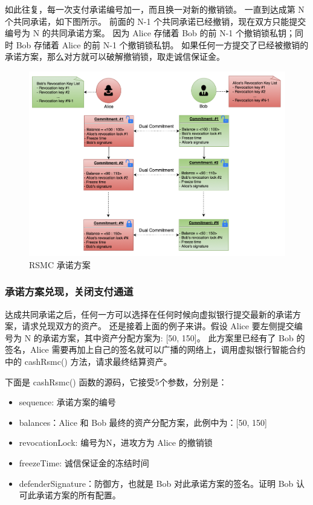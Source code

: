 \begin{appendices}
如此往复，每一次支付承诺编号加一，而且换一对新的撤销锁。
一直到达成第 N 个共同承诺，如下图所示。
前面的 N-1 个共同承诺已经撤销，现在双方只能提交编号为 N 的共同承诺方案。
因为 Alice 存储着 Bob 的前 N-1 个撤销锁私钥；同时 Bob 存储着 Alice 的前 N-1 个撤销锁私钥。
如果任何一方提交了已经被撤销的承诺方案，那么对方就可以破解撤销锁，取走诚信保证金。

\begin{figure}[h!]
    \centering
    \includegraphics[width=12cm, keepaspectratio]{../images/dual_rsmc_3.png}
    \caption{RSMC 承诺方案}
    \label{fig:A_rsmc_4}
\end{figure}

\subsubsection{承诺方案兑现，关闭支付通道}
达成共同承诺之后，任何一方可以选择在任何时候向虚拟银行提交最新的承诺方案，请求兑现双方的资产。
还是接着上面的例子来讲。假设 Alice 要左侧提交编号为 N 的承诺方案，其中资产分配方案为: [50, 150]。
此方案里已经有了 Bob 的签名，Alice 需要再加上自己的签名就可以广播的网络上，调用虚拟银行智能合约中的 cashRsmc() 方法，请求最终结算资产。

下面是 cashRsmc() 函数的源码，它接受5个参数，分别是：
\begin{itemize}
    \item sequence: 承诺方案的编号
    \item balances：Alice 和 Bob 最终的资产分配方案，此例中为：[50, 150]
    \item revocationLock: 编号为N，进攻方为 Alice 的撤销锁
    \item freezeTime: 诚信保证金的冻结时间
    \item defenderSignature：防御方，也就是 Bob 对此承诺方案的签名。证明 Bob 认可此承诺方案的所有配置。
\end{itemize}


\end{appendices}
